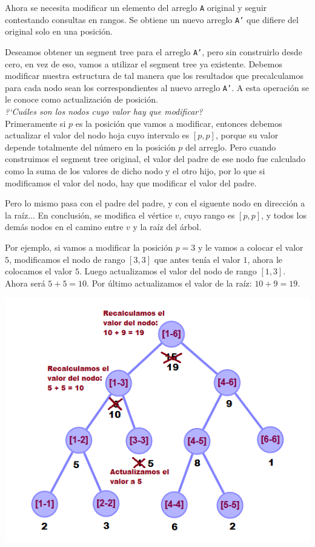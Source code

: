 Ahora se necesita modificar un elemento del arreglo \texttt{A} original y seguir contestando consultas en rangos. Se obtiene un nuevo arreglo \texttt{A'} que difiere del original solo en una posici\'on.

Deseamos obtener un segment tree para el arreglo \texttt{A'}, pero sin construirlo desde cero, en vez de eso, vamos a utilizar el segment tree ya existente. Debemos modificar nuestra estructura de tal manera que los resultados que precalculamos para cada nodo sean los correspondientes al nuevo arreglo \texttt{A'}. A esta operaci\'on se le conoce como actualizaci\'on de posici\'on.\\

\noindent\textit{?`Cu\'ales son los nodos cuyo valor hay que modificar?} \\
Primeramente si $p$ es la posici\'on que vamos a modificar, entonces debemos actualizar el valor del nodo hoja cuyo intervalo es $[p, p]$, porque su valor depende totalmente del n\'umero en la posici\'on $p$ del arreglo. Pero cuando construimos el segment tree original, el valor del padre de ese nodo fue calculado como la suma de los valores de dicho nodo y el otro hijo, por lo que si modificamos el valor del nodo, hay que modificar el valor del padre.

Pero lo mismo pasa con el padre del padre, y con el siguente nodo en direcci\'on a la ra\'iz... En conclusi\'on, se modifica el v\'ertice $v$, cuyo rango es $[p, p]$, y todos los dem\'as nodos en el camino entre $v$ y la ra\'iz del \'arbol.

Por ejemplo, si vamos a modificar la posici\'on $p = 3$ y le vamos a colocar el valor $5$, modificamos el nodo de rango $[3, 3]$ que antes ten\'ia el valor $1$, ahora le colocamos el valor $5$. Luego actualizamos el valor del nodo de rango $[1, 3]$. Ahora ser\'a $5 + 5 = 10$. Por \'ultimo actualizamos el valor de la ra\'iz: $10 + 9 = 19$.

\begin{minipage}{\columnwidth}
    \includegraphics[width=\linewidth]{imag/segment_tree_update}
    \label{fig:example_st_casos}
\end{minipage}

